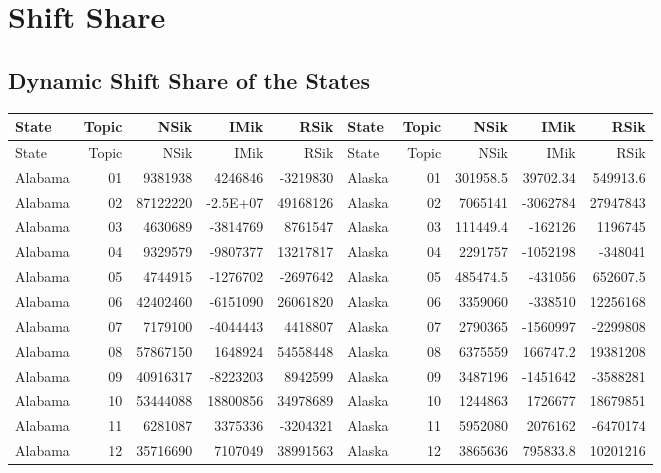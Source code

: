 \chapter{Shift Share}
\label{appendix:shiftshare}
\section{Dynamic Shift Share of the States}

\begin{landscape}
\begin{singlespace}
	


	\begin{longtable}{lrrrr|lrrrr}
		
		State & Topic & NSik & IMik & RSik & State & Topic & NSik & IMik & RSik \\
		\endfirsthead
		State & Topic & NSik & IMik & RSik & State & Topic & NSik & IMik & RSik \\
		\endhead
		Alabama &  01  & 9381938 & 4246846 & -3219830 & Alaska &  01  & 301958.5 & 39702.34 & 549913.6 \\
		Alabama &  02  & 87122220 & -2.5E+07 & 49168126 & Alaska &  02  & 7065141 & -3062784 & 27947843 \\
		Alabama &  03  & 4630689 & -3814769 & 8761547 & Alaska &  03  & 111449.4 & -162126 & 1196745 \\
		Alabama &  04  & 9329579 & -9807377 & 13217817 & Alaska &  04  & 2291757 & -1052198 & -348041 \\
		Alabama &  05  & 4744915 & -1276702 & -2697642 & Alaska &  05  & 485474.5 & -431056 & 652607.5 \\
		Alabama &  06  & 42402460 & -6151090 & 26061820 & Alaska &  06  & 3359060 & -338510 & 12256168 \\
		Alabama &  07  & 7179100 & -4044443 & 4418807 & Alaska &  07  & 2790365 & -1560997 & -2299808 \\
		Alabama &  08  & 57867150 & 1648924 & 54558448 & Alaska &  08  & 6375559 & 166747.2 & 19381208 \\
		Alabama &  09  & 40916317 & -8223203 & 8942599 & Alaska &  09  & 3487196 & -1451642 & -3588281 \\
		Alabama &  10 & 53444088 & 18800856 & 34978689 & Alaska &  10 & 1244863 & 1726677 & 18679851 \\
		Alabama &  11 & 6281087 & 3375336 & -3204321 & Alaska &  11 & 5952080 & 2076162 & -6470174 \\
		Alabama &  12 & 35716690 & 7107049 & 38991563 & Alaska &  12 & 3865636 & 795833.8 & 10201216 \\

\end{longtable}
\end{singlespace}
\end{landscape}
